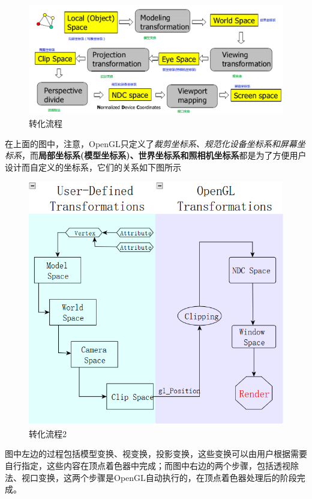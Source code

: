 \documentclass[UTF8,a4paper,12pt]{ctexbook}
\begin{document}
		\begin{figure}[htbp]
			\centering
			\includegraphics[scale = 0.57]{transferAll.png}
			\caption{转化流程}
		\end{figure}
		
		在上面的图中，注意，OpenGL只定义了\textit{裁剪坐标系、规范化设备坐标系和屏幕坐标系}，而\textbf{局部坐标系(模型坐标系)、世界坐标系和照相机坐标系}都是为了方便用户设计而自定义的坐标系，它们的关系如下图所示
		
		\begin{figure}[htbp]
			\centering
			\includegraphics[scale = 0.9]{transferAll2.png}
			\caption{转化流程2}
		\end{figure}
		
		图中左边的过程包括模型变换、视变换，投影变换，这些变换可以由用户根据需要自行指定，这些内容在顶点着色器中完成；而图中右边的两个步骤，包括透视除法、视口变换，这两个步骤是OpenGL自动执行的，在顶点着色器处理后的阶段完成。
		
\end{document}
